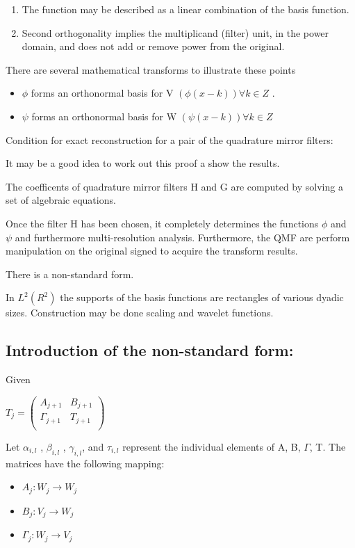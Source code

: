 \documentclass[11pt]{article}
\begin{document}
\begin{enumerate}
\item The function may be described as a linear combination of the basis function.
\item Second orthogonality implies the multiplicand (filter) unit, in the power domain, and does not add or remove power from the original.
\end{enumerate}

There are several mathematical transforms to illustrate these points 
\begin{itemize}
\item $\phi$ forms an orthonormal basis for V $(\phi(x-k)) \forall k \in Z$ .
\item $\psi$ forms an orthonormal basis for W $(\psi (x-k)) \forall k \in Z$
\end{itemize}
 
Condition for exact reconstruction for a pair of the quadrature mirror filters:


It may be a good idea to work out this proof a show the results.  

The coefficents of quadrature mirror filters H and G are computed by solving a set of algebraic equations.  

Once the filter H has been chosen, it completely determines the functions $\phi$  and $\psi$ and furthermore multi-resolution analysis.  Furthermore, the QMF are perform manipulation on the original signed to acquire the transform results.  

There is a non-standard form.

In $L^2(R^2)$ the supports of the basis functions are rectangles of various dyadic sizes.  Construction may be done scaling and wavelet functions.  

\subsection{Introduction of the non-standard form:}


Given

 $T_j=
\left(
\begin{array}{ccc}
{A}_{j+1}  & B _{j+1} \\
\Gamma _{j+1} & T_{j+1} \\
\end{array}
\right)
$

Let $\alpha _{i,l}$ , $\beta _{i,l}$ , $\gamma _{i,l}$, and $\tau_{i,l}$ represent the individual elements of A, B, $\Gamma$, T.  The matrices have the following mapping:
\begin{itemize}
\item $A_j:W_j \rightarrow W_j$
\item $B_j:V_j \rightarrow W_j$
\item $\Gamma _j: W_j \rightarrow V_j$
\end{itemize}
\end{document}
